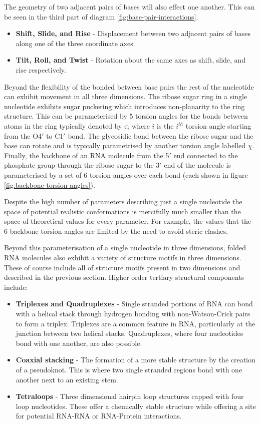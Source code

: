 \documentclass[journal]{IEEEtran}
\begin{document}
The geometry of two adjacent pairs of bases will also effect one another. This can be seen in the third part of diagram \ref{fig:base-pair-interactions}.

\begin{itemize}
	\item \textbf{Shift, Slide, and Rise} - Displacement between two adjacent pairs of bases along one of the three coordinate axes.
	\item \textbf{Tilt, Roll, and Twist} - Rotation about the same axes as shift, slide, and rise respectively.
\end{itemize}

Beyond the flexibility of the bonded between base pairs the rest of the nucleotide can exhibit movement in all three dimensions. The ribose sugar ring in a single nucleotide exhibits sugar puckering which introduces non-planarity to the ring structure. This can be parameterised by 5 torsion angles for the bonds between atoms in the ring typically denoted by $\tau_i$ where $i$ is the $i^{th}$ torsion angle starting from the O4$'$ to C1$'$ bond. The glycosidic bond between the ribose sugar and the base can rotate and is typically parametrised by another torsion angle labelled $\chi$. Finally, the backbone of an RNA molecule from the 5$'$ end connected to the phosphate group through the ribose sugar to the 3$'$ end of the molecule is parameterised by a set of 6 torsion angles over each bond (each shown in figure \ref{fig:backbone-torsion-angles}).

Despite the high number of parameters describing just a single nucleotide the space of potential realistic conformations is mercifully much smaller than the space of theoretical values for every parameter. For example, the values that the 6 backbone torsion angles are limited by the need to avoid steric clashes.

Beyond this parameterisation of a single nucleotide in three dimensions, folded RNA molecules also exhibit a variety of structure motifs in three dimensions. These of course include all of structure motifs present in two dimensions and described in the previous section. Higher order tertiary structural components include:

\begin{itemize}
	\item \textbf{Triplexes and Quadruplexes} - Single stranded portions of RNA can bond with a helical stack through hydrogen bonding with non-Watson-Crick pairs to form a triplex. Triplexes are a common feature in RNA, particularly at the junction between two helical stacks. Quadruplexes, where four nucleotides bond with one another, are also possible.
	\item \textbf{Coaxial stacking} - The formation of a more stable structure by the creation of a pseudoknot. This is where two single stranded regions bond with one another next to an existing stem.
	\item \textbf{Tetraloops} - Three dimensional hairpin loop structures capped with four loop nucleotides. These offer a chemically stable structure while offering a site for potential RNA-RNA or RNA-Protein interactions.
\end{itemize}
\end{document}
